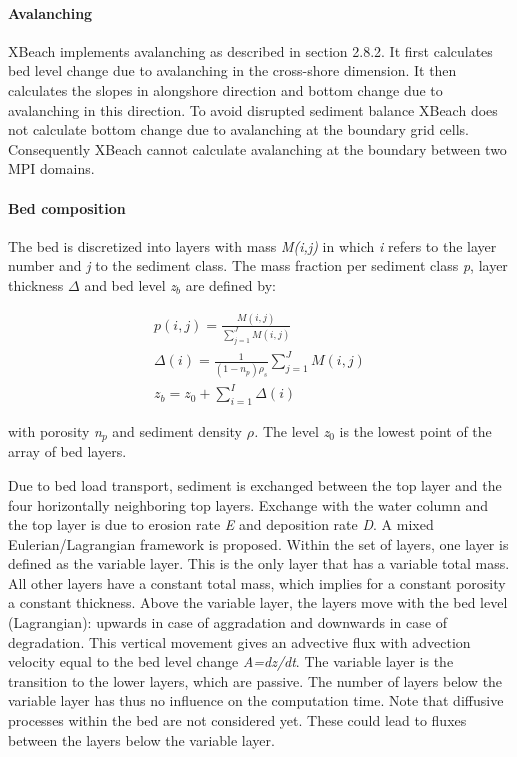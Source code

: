 \documentclass{article}
\begin{document}
\paragraph{ Avalanching}

\noindent XBeach implements avalanching as described in section 2.8.2. It first calculates bed level change due to avalanching in the cross-shore dimension. It then calculates the slopes in alongshore direction and bottom change due to avalanching in this direction. To avoid disrupted sediment balance XBeach does not calculate bottom change due to avalanching at the boundary grid cells. Consequently XBeach cannot calculate avalanching at the boundary between two MPI domains.


\paragraph{ Bed composition}

\noindent The bed is discretized into layers with mass \textit{M(i,j)} in which \textit{i }refers to the layer number and\textit{ j} to the sediment class. The mass fraction per sediment class \textit{p}, layer thickness \textit{$\Delta $} and bed level \textit{z${}_{b}$} are defined by:

\noindent 
\begin{equation} \label{6.20)} 
\begin{array}{l} {p(i,j)=\frac{M(i,j)}{\sum _{j=1}^{J}M(i,j) } } \\ {\Delta (i)=\frac{1}{\left(1-n_{p} \right)\rho _{s} } \sum _{j=1}^{J}M(i,j) } \\ {z_{b} =z_{0} +\sum _{i=1}^{I}\Delta (i) } \end{array} 
\end{equation} 
 

\noindent with porosity \textit{n${}_{p}$ }and sediment density \textit{$\rho $. }The level \textit{z${}_{0}$} is the lowest point of the array of bed layers.

\noindent 

\noindent Due to bed load transport, sediment is exchanged between the top layer and the four horizontally neighboring top layers. Exchange with the water column and the top layer is due to erosion rate \textit{E} and deposition rate\textit{ D}. A mixed Eulerian/Lagrangian framework is proposed. Within the set of layers, one layer is defined as the variable layer. This is the only layer that has a variable total mass. All other layers have a constant total mass, which implies for a constant porosity a constant thickness. Above the variable layer, the layers move with the bed level (Lagrangian): upwards in case of aggradation and downwards in case of degradation. This vertical movement gives an advective flux with advection velocity equal to the bed level change \textit{A=dz/dt}. The variable layer is the transition to the lower layers, which are passive. The number of layers below the variable layer has thus no influence on the computation time. Note that diffusive processes within the bed are not considered yet. These could lead to fluxes between the layers below the variable layer.
\end{document}
